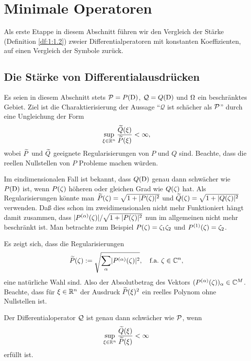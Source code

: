 \chapter{Minimale Operatoren}

Als erste Etappe in diesem Abschnitt führen wir den Vergleich der Stärke (Definition \ref{df:1:1.2})
zweier Differentialperatoren mit konstanten Koeffizienten,
auf einen Vergleich der Symbole zurück.

\section{Die Stärke von Differentialausdrücken}

Es seien in diesem Abschnitt stets $\mathcal P=P(\mathrm D)$, $\mathcal Q=Q(\mathrm D)$ und $\Omega$ ein beschränktes Gebiet.
Ziel ist die Charaktierisierung der Aussage ``$\mathcal Q$ ist schächer als $\mathcal P$''
durch eine Ungleichung der Form
\begin{equation}\label{eq:2:1}
\sup_{\xi\in\mathbb R^n}\frac{\widetilde{Q}(\xi)}{\widetilde{P}(\xi)}<\infty,
\end{equation}
wobei $\widetilde{P}$ und $\widetilde{Q}$ geeignete Regularisierungen von $P$ und $Q$ sind.
Beachte, dass die reellen Nullstellen von $P$ Probleme machen würden.

Im eindimensionalen Fall ist bekannt, dass $Q(\mathrm D)$ genau dann schwächer wie $P(\mathrm D)$ ist,
wenn $P(\zeta)$ höheren oder gleichen Grad wie $Q(\zeta)$ hat.
Als Regularisierungen könnte man $\widetilde{P}(\zeta)=\sqrt{1+\lvert P(\zeta)\rvert^2}$
und $\widetilde{Q}(\zeta)=\sqrt{1+\lvert Q(\zeta)\rvert^2}$ verwenden.
Daß dies schon im zweidimensionalen nicht mehr Funktioniert
hängt damit zusammen, dass $\lvert P^{(\alpha)}(\zeta)\rvert/\sqrt{1+\lvert P(\zeta)\rvert^2}$
nun im allgemeinen nicht mehr beschränkt ist.
Man betrachte zum Beispiel $P(\zeta)=\zeta_1\zeta_2$ und $P^{(1)}(\zeta)=\zeta_2$.

Es zeigt sich, dass die Regularisierungen
\begin{equation}\label{eq:2:2}
\widetilde{P}(\zeta):=\sqrt{\sum_\alpha\lvert P^{(\alpha)}(\zeta)\rvert^2},
\quad\text{f.a.}~\zeta\in\mathbb C^n,
\end{equation}
eine natürliche Wahl sind.
Also der Absolutbetrag des Vektors $(P^{(\alpha)}(\zeta))_\alpha\in\mathbb C^M$.
Beachte, dass für $\xi\in\mathbb R^n$ der Ausdruck
$\widetilde{P}(\xi)^2$ ein reelles Polynom ohne Nullstellen ist.

\begin{thm}\label{thm:2:2.1}
Der Differentialoperator $\mathcal Q$ ist genau dann schwächer wie $\mathcal P$,
wenn
\begin{equation}\label{eq:thm:2:2.1}
\sup_{\xi\in\mathbb R^n}\frac{\widetilde{Q}(\xi)}{\widetilde{P}(\xi)}<\infty
\end{equation}
erfüllt ist.
\end{thm}

